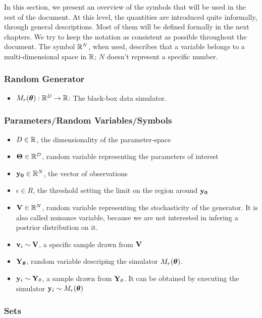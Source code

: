 In this section, we present an overview of the symbols that will be
used in the rest of the document. At this level, the quantities are
introduced quite informally, through general descriptions. Most of
them will be defined formally in the next chapters. We try to keep the
notation as consistent as possible throughout the document. The symbol
$\mathbb{R}^N$, when used, describes that a variable belongs to a
multi-dimensional space in $\mathbb{R}$; $N$ doesn't represent a specific
number.

\subsubsection*{Random Generator}
\label{sec:random-generator}
\begin{itemize}
\item $M_r(\boldsymbol{\theta}): \mathbb{R}^D \rightarrow \mathbb{R}$: The black-box data simulator.
\end{itemize}

\subsubsection*{Parameters/Random Variables/Symbols}
\label{sec:variables}

\begin{itemize}
\item $D \in \mathbb{R}$, the dimensionality of the parameter-space
\item $\mathbf{\Theta} \in \mathbb{R}^D$, random variable representing the parameters of interest
\item $\mathbf{y_0} \in \mathbb{R}^N$, the vector of observations
\item $\epsilon \in R$, the threshold setting the limit on the region around $\mathbf{y_0}$
\item $\mathbf{V} \in \mathbb{R}^N$, random variable representing the stochasticity of
  the generator. It is also called nuisance variable, because we are not interested in infering a postrior distribution on it.
\item $\mathbf{v}_i \sim \mathbf{V}$, a specific sample drawn from $\mathbf{V}$
\item $\mathbf{Y}_{\boldsymbol{\theta}}$, random variable descriping the simulator $M_r(\boldsymbol{\theta})$. 
\item $\mathbf{y}_i \sim \mathbf{Y}_\theta$, a sample drawn from $\mathbf{Y}_\theta$. It can
  be obtained by executing the simulator $\mathbf{y}_i \sim M_r(\boldsymbol{\theta})$
\end{itemize}


\subsubsection*{Sets}
\label{sec:sets}

